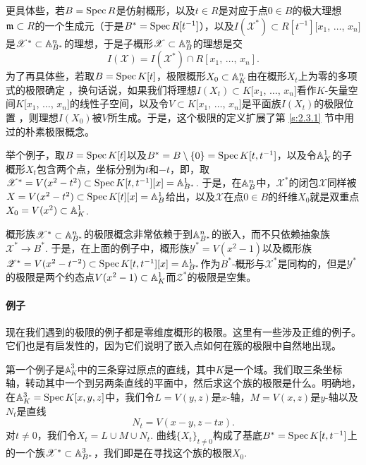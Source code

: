 更具体些，若$B=\operatorname{Spec} R$是仿射概形，以及$t\in R$是对应于点$0\in B$的极大理想$\mathfrak{m}\subset R$的一个生成元（于是$B^*=\operatorname{Spec} R[t^{-1}]$），以及$I(\mathscr{X}^*)\subset R[t^{-1}][x_1$, $\dots$, $x_n]$是$\mathscr{X}^*\subset \mathbb{A}_{B^*}^n$的理想，于是子概形$\mathscr{X}\subset \mathbb{A}_{B}^n$的理想是交
\[
	I(\mathscr{X})=I(\mathscr{X}^*)\cap R[x_1,\,\dots,\,x_n].
\]
为了再具体些，若取$B=\operatorname{Spec} K[t]$，极限概形$X_0\subset \mathbb{A}_K^n$由在概形$X_t$上为零的多项式的极限确定%
，换句话说，如果我们将理想$I(X_t)\subset K[x_1$, $\dots$, $x_n]$看作$K$\hyp 矢量空间$K[x_1$, $\dots$, $x_n]$的线性子空间，以及令$V\subset K[x_1$, $\dots$, $x_n]$是平面族$I(X_t)$的极限位置 ，则理想$I(X_0)$被$V$所生成。于是，这个极限的定义扩展了第 \ref{s:2.3.1} 节中用过的朴素极限概念。

举个例子，取$B=\operatorname{Spec} K[t]$以及$B^*=B\setminus \{0\}=\operatorname{Spec} K[t,t^{-1}]$，以及令$\mathbb{A}_K^1$的子概形$X_t$包含两个点，坐标分别为$t$和$-t$，即，取$\mathscr{X}^*=V(x^2-t^2)\subset \operatorname{Spec} K[t,t^{-1}][x]=\mathbb{A}_{B^*}^1$. 于是，在$\mathbb{A}_B^n$中，$\mathscr{X}^*$的闭包$\mathscr{X}$同样被$X=V(x^2-t^2)\subset \operatorname{Spec} K[t][x]=\mathbb{A}_B^1$给出，以及$\mathscr{X}$在点$0\in B$的纤维$X_0$就是双重点$X_0=V(x^2)\subset\mathbb{A}_K^1$.

概形族$\mathscr{X}^*\subset \mathbb{A}_{B^*}^n$的极限概念非常依赖于到$\mathbb{A}_{B^*}^n$的嵌入，而不只依赖抽象族$\mathscr{X}^*\to B^*$. 于是，在上面的例子中，概形族$\mathscr{Y}^*=V(x^2-1)$以及概形族$\mathscr{Z}^*=V(x^2-t^{-2})\subset \operatorname{Spec} K[t,t^{-1}][x]=\mathbb{A}_{B^*}^1$作为$B^*$-概形与$\mathscr{X}^*$是同构的，但是$\mathscr{Y}^*$的极限是两个约态点$V(x^2-1)\subset \mathbb{A}^1_K$而$\mathscr{Z}^*$的极限是空集。

\paragraph*{例子}
现在我们遇到的极限的例子都是零维度概形的极限。这里有一些涉及正维的例子。 它们也是有启发性的，因为它们说明了嵌入点如何在簇的极限中自然地出现。

第一个例子是$\mathbb{A}_K^3$中的三条穿过原点的直线，其中$K$是一个域。我们取三条坐标轴，转动其中一个到另两条直线的平面中，然后求这个族的极限是什么。明确地，在$\mathbb{A}_K^3=\operatorname{Spec} K[x,y,z]$中，我们令$L=V(y,z)$是$x$-轴，$M=V(x,z)$是$y$-轴以及$N_t$是直线
\[
	N_t=V(x-y,z-tx).
\]
对$t\neq 0$，我们令$X_t=L\cup M\cup N_t$. 曲线$\{X_t\}_{t\neq 0}$构成了基底$B^*=\operatorname{Spec} K[t,t^{-1}]$上的一个族$\mathscr{X}^*\subset \mathbb{A}_{B^*}^3$，我们即是在寻找这个族的极限$X_0$.

